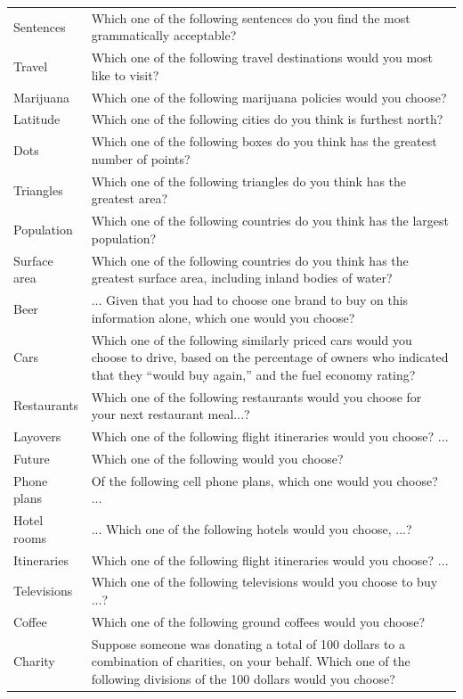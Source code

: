 \documentclass[11pt,letter]{article}
\begin{document}
\begin{table}[h!]
\begin{small}
\begin{tabular}{lp{12cm}}
      Sentences & Which one of the following sentences do you find the most grammatically acceptable? \\
      Travel & Which one of the following travel destinations would you most like to visit? \\
      Marijuana & Which one of the following marijuana policies would you choose? \\
      Latitude & Which one of the following cities do you think is furthest north? \\
      Dots & Which one of the following boxes do you think has the greatest number of points? \\
      Triangles & Which one of the following triangles do you think has the greatest area? \\
      Population & Which one of the following countries do you think has the largest population? \\
      Surface area & Which one of the following countries do you think has the greatest surface area, including inland bodies of water? \\
      Beer & ... Given that you had to choose one brand to buy on this information alone, which one would you choose? \\
      Cars & Which one of the following similarly priced cars would you choose to drive, based on the percentage of owners who indicated that they ``would buy again,'' and the fuel economy rating? \\
      Restaurants & Which one of the following restaurants would you choose for your next restaurant meal...? \\
      Layovers & Which one of the following flight itineraries would you choose? ... \\
      Future & Which one of the following would you choose? \\
      Phone plans & Of the following cell phone plans, which one would you choose? ... \\
      Hotel rooms & ... Which one of the following hotels would you choose, ...? \\
      Itineraries & Which one of the following flight itineraries would you choose? ... \\
      Televisions & Which one of the following televisions would you choose to buy ...? \\
      Coffee & Which one of the following ground coffees would you choose? \\
      Charity & Suppose someone was donating a total of 100 dollars to a combination of charities, on your behalf.
      Which one of the following divisions of the 100 dollars would you choose? \\
    \end{tabular}
  \end{small}
\end{table}
\end{document}
